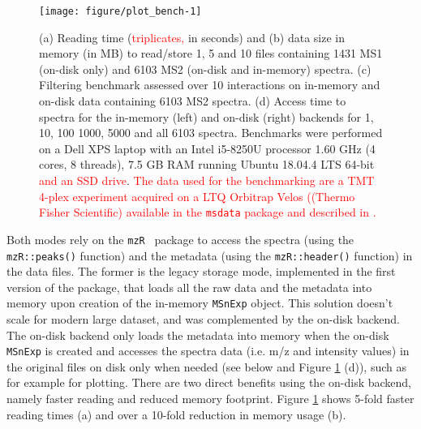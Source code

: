 \documentclass[journal=jacsat,manuscript=article]{achemso}\usepackage[]{graphicx}\usepackage[]{color}
\newenvironment{knitrout}{}{} %
\begin{document}
\begin{figure}[p]
  \centering
\begin{knitrout}
\color{fgcolor}
\texttt{[image: figure/plot\_bench-1]} 

\end{knitrout}
\caption{(a) Reading time (\textcolor{red}{triplicates,} in seconds)
  and (b) data size in memory (in MB) to read/store 1, 5 and 10 files
  containing 1431 MS1 (on-disk only) and 6103 MS2 (on-disk and
  in-memory) spectra. (c) Filtering benchmark assessed over 10
  interactions on in-memory and on-disk data containing 6103 MS2
  spectra.  (d) Access time to spectra for the in-memory (left) and
  on-disk (right) backends for 1, 10, 100 1000, 5000 and all 6103
  spectra. Benchmarks were performed on a Dell XPS laptop with an
  Intel i5-8250U processor 1.60 GHz (4 cores, 8 threads), 7.5 GB RAM
  running Ubuntu 18.04.4 LTS 64-bit \textcolor{red}{and an SSD
    drive}. \textcolor{red}{The data used for the benchmarking are a
    TMT 4-plex experiment acquired on a LTQ Orbitrap Velos ((Thermo
    Fisher Scientific) available in the \texttt{msdata} package and
    described in \citep{Gatto:2014}.}}
\label{fig:bench}
\end{figure}

Both modes rely on the \texttt{mzR}~\cite{Chambers:2012} package to
access the spectra (using the \texttt{mzR::peaks()} function) and the
metadata (using the \texttt{mzR::header()} function) in the data
files. The former is the legacy storage mode, implemented in the first
version of the package, that loads all the raw data and the metadata
into memory upon creation of the in-memory \texttt{MSnExp}
object. This solution doesn't scale for modern large dataset, and was
complemented by the on-disk backend. The on-disk backend only loads
the metadata into memory when the on-disk \texttt{MSnExp} is created
and accesses the spectra data (i.e. m/z and intensity values) in the
original files on disk only when needed (see below and Figure
\ref{fig:bench} (d)), such as for example for plotting. There are two
direct benefits using the on-disk backend, namely faster reading and
reduced memory footprint. Figure \ref{fig:bench} shows 5-fold faster
reading times (a) and over a 10-fold reduction in memory usage (b).
\end{document}
